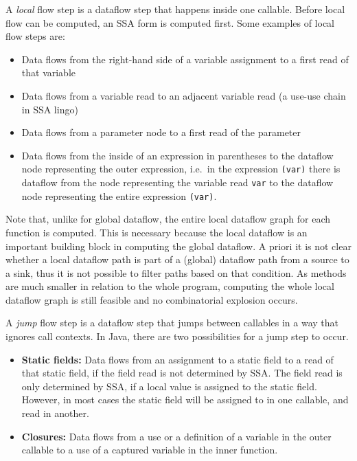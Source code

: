 A \emph{local} flow step is a dataflow step that happens inside one callable.
Before local flow can be computed, an SSA form is computed first.
Some examples of local flow steps are:
\begin{itemize}
    \item Data flows from the right-hand side of a variable assignment to a 
    first read of that variable
    \item Data flows from a variable read to an adjacent variable read (a use-use chain in SSA lingo)
    \item Data flows from a parameter node to a first read of the parameter
    \item Data flows from the inside of an expression in parentheses to the dataflow node
    representing the outer expression, i.e.\ in the expression \texttt{(var)} there is dataflow from the node 
    representing the variable read \texttt{var} to the dataflow node representing the entire expression \texttt{(var)}.
\end{itemize}
Note that, unlike for global dataflow, the entire local dataflow graph for each function 
is computed.
This is necessary because the local dataflow is an important building block in computing
the global dataflow.
A priori it is not clear whether a local dataflow path is part of a (global) dataflow path
from a source to a sink, thus it is not possible to filter paths based on that condition.
As methods are much smaller in relation to the whole program, computing the whole local 
dataflow graph is still feasible and no combinatorial explosion occurs.

A \emph{jump} flow step is a dataflow step that jumps between callables 
in a way that ignores call contexts.
In Java, there are two possibilities for a jump step to occur.
\begin{itemize}
    \item \textbf{Static fields:} Data flows from an assignment to a static field to a read of that static field,
    if the field read is not determined by SSA.
    The field read is only determined by SSA, if a local value is assigned to the static field.
    However, in most cases the static field will be assigned to in one callable, and read 
    in another.
    \item \textbf{Closures:} Data flows from a use or a definition of a variable in the outer callable 
    to a use of a captured variable in the inner function.
\end{itemize}

